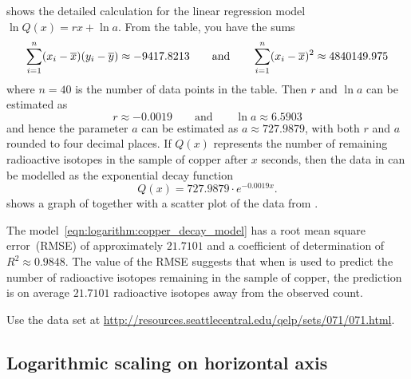 \documentclass[a4paper,oneside,12pt]{article}
\begin{document}
{\begin{solution}
 shows the detailed
calculation for the linear regression model
$\ln Q(x) = rx + \ln a$.  From the table, you have the sums
\[
\sum_{i=1}^n (x_i - \overline{x}) (y_i - \overline{y})
\approx
-9417.8213
\qquad
\text{and}
\qquad
\sum_{i=1}^n (x_i - \overline{x})^2
\approx
4840149.975
\]
where $n = 40$ is the number of data points in the table.  Then $r$
and $\ln a$ can be estimated as
\[
r
\approx
-0.0019
\qquad
\text{and}
\qquad
\ln a
\approx
6.5903
\]
and hence the parameter $a$ can be estimated as
$a \approx 727.9879$, with both $r$ and $a$ rounded to four decimal
places.  If $Q(x)$ represents the number of remaining radioactive
isotopes in the sample of copper after $x$ seconds, then the data in
 can be modelled as the
exponential decay function
\begin{equation}
\label{eqn:logarithm:copper_decay_model}
Q(x)
=
727.9879 \cdot e^{-0.0019 x}.
\end{equation}
 shows a
graph of  together with a
scatter plot of the data from
.

The model~\eqref{eqn:logarithm:copper_decay_model} has a root mean
square error~(RMSE) of approximately $21.7101$ and a coefficient of
determination of $R^2 \approx 0.9848$.  The value of the RMSE suggests
that when  is used to
predict the number of radioactive isotopes remaining in the sample of
copper, the prediction is on average $21.7101$ radioactive isotopes
away from the observed count.
\end{solution}
}{}

\begin{exercise}
Use the data set at
\url{http://resources.seattlecentral.edu/qelp/sets/071/071.html}.
\end{exercise}




\subsection{Logarithmic scaling on horizontal axis}
\label{subsec:logarithm:logarithmic_scaling_on_horizontal_axis}
\end{document}
